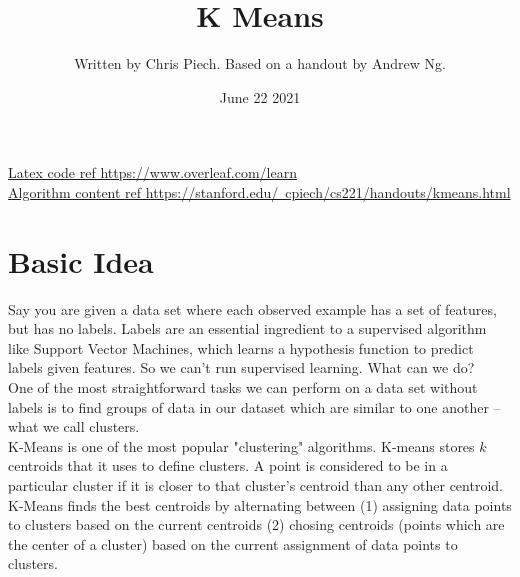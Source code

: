 \documentclass[10pt,letterpaper]{article}
\title{\textbf{K Means}}
\author{Written by Chris Piech. Based on a handout by Andrew Ng.}
\date{June 22 2021}
\begin{document}
\begin{titlepage}
\maketitle\maketitle
\begin{flushleft}
\href{https://www.overleaf.com/learn}{Latex code ref https://www.overleaf.com/learn} \\
\href{https://stanford.edu/~cpiech/cs221/handouts/kmeans.html}{Algorithm content ref https://stanford.edu/~cpiech/cs221/handouts/kmeans.html}
\end{flushleft}
\end{titlepage}
\section{Basic Idea}
Say you are given a data set where each observed example has a set of features, but has no labels. Labels are an essential ingredient to a supervised algorithm like Support Vector Machines, which learns a hypothesis function to predict labels given features. So we can't run supervised learning. What can we do? \\

One of the most straightforward tasks we can perform on a data set without labels is to find groups of data in our dataset which are similar to one another -- what we call clusters.\\

K-Means is one of the most popular "clustering" algorithms. K-means stores $k$ centroids that it uses to define clusters. A point is considered to be in a particular cluster if it is closer to that cluster's centroid than any other centroid.\\

K-Means finds the best centroids by alternating between (1) assigning data points to clusters based on the current centroids (2) chosing centroids (points which are the center of a cluster) based on the current assignment of data points to clusters.\\
\end{document}
